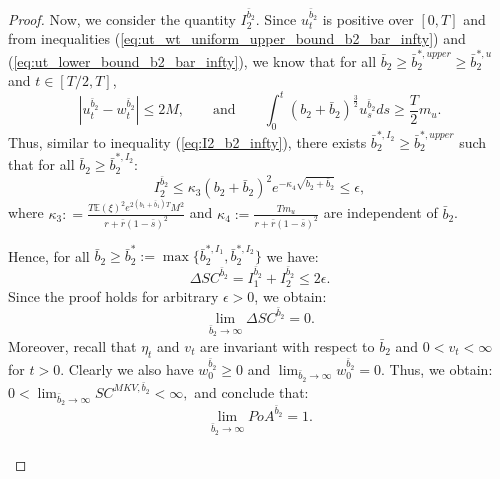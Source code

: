 \documentclass[11pt]{article}
\begin{document}
\begin{proof}
	Now, we consider the quantity $I^{\bar{b}_2}_2$. Since $u_t^{\bar{b}_2}$ is positive over $[0,T]$ and from inequalities (\ref{eq:ut_wt_uniform_upper_bound_b2_bar_infty}) and (\ref{eq:ut_lower_bound_b2_bar_infty}), we know that for all $\bar{b}_2 \geq \bar{b}_2^{*,upper} \geq \bar{b}_2^{*,u}$ and $t \in [T/2,T]$,
	\begin{equation*}
	\left\vert u_t^{\bar{b}_2} - w_t^{\bar{b}_2} \right\vert \leq 2M,\qquad \text{and} \qquad \int_0^t (b_2 + \bar{b}_2)^{\frac{3}{2}} u_s^{\bar{b}_2} ds \geq \frac{T}{2}m_u.
	\end{equation*}
	Thus, similar to inequality (\ref{eq:I2_b2_infty}), there exists $\bar{b}_2^{*,I_2} \geq \bar{b}_2^{*,upper}$ such that for all $\bar{b}_2 \geq \bar{b}_2^{*,I_2}$:
	\begin{equation*}
	I^{\bar{b}_2}_2  \leq  \kappa_3 (b_2 + \bar{b}_2)^2 e^{ - \kappa_4 \sqrt{b_2 + \bar{b}_2} } \leq \epsilon,
	\end{equation*}
	where  $\kappa_3: =\frac{T \mathbb{E}(\xi)^2 e^{2 (b_1 + \bar{b}_1) T} M^2 }{r + \bar{r}(1-\bar{s})^2}$ and $\kappa_4 := \frac{T m_u}{r + \bar{r}(1-\bar{s})^2}$ are independent of $\bar{b}_2$.
	
	Hence, for all $\bar{b}_2 \geq \bar{b}_2^* := \max \{ \bar{b}_2^{*,I_1}, \bar{b}_2^{*,I_2}\}$ we have:
	\begin{equation*}
	\Delta SC^{\bar{b}_2} = I^{\bar{b}_2}_1 + I^{\bar{b}_2}_2 \leq 2\epsilon.
	\end{equation*} 
	Since the proof holds for arbitrary $\epsilon > 0$, we obtain:
	\begin{equation*}
	\lim_{\bar{b}_2 \to \infty} \Delta SC^{\bar{b}_2} = 0.
	\end{equation*}
	Moreover, recall that $\eta_t$ and $v_t$ are invariant with respect to $\bar{b}_2$ and $0<v_t<\infty$ for $t>0$. Clearly we also have $w^{\bar{b}_2}_0 \geq 0$ and $\lim_{\bar{b}_2 \to \infty}w^{\bar{b}_2}_0 = 0$. Thus, we obtain:
	$0< \lim_{\bar{b}_2 \to \infty} SC^{MKV,\bar{b}_2} <\infty,$
	and conclude that:
	$$ \lim_{\bar{b}_2 \to \infty} PoA^{\bar{b}_2} = 1.$$\\
	

\end{proof}
\end{document}
